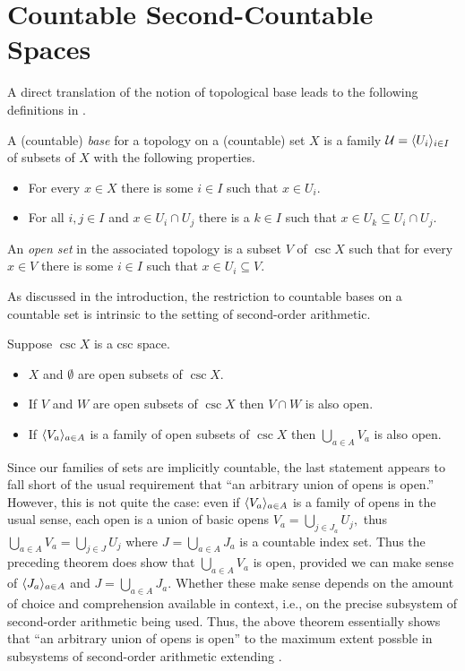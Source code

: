 \documentclass[csc]{subfiles}
\begin{document}
\section{Countable Second-Countable Spaces}

A direct translation of the notion of topological base leads to the following definitions in \ACA.

\begin{definition*}[\ACA]
  A (countable) \emph{base} for a topology on a (countable) set \(X\) is a family \(\mathcal{U} = \langle U_i\rangle_{i \in I}\) of subsets of \(X\) with the following properties.
  \begin{itemize}
  \item For every \(x \in X\) there is some \(i \in I\) such that \(x \in U_i.\)
  \item For all \(i,j \in I\) and \(x \in U_i \cap U_j\) there is a \(k \in I\) such that \(x \in U_k \subseteq U_i \cap U_j.\)
  \end{itemize}

  An \emph{open set} in the associated topology is a subset \(V\) of \(\csc{X}\) such that for every \(x \in V\) there is some \(i \in I\) such that \(x \in U_i \subseteq V.\)
\end{definition*}

\noindent
As discussed in the introduction, the restriction to countable bases on a countable set is intrinsic to the setting of second-order arithmetic.

\begin{theorem*}[\ACA]
  Suppose \(\csc{X}\) is a csc space.
  \begin{itemize}
  \item \(X\) and \(\emptyset\) are open subsets of \(\csc{X}.\)
  \item If \(V\) and \(W\) are open subsets of \(\csc{X}\) then \(V \cap W\) is also open.
  \item If \(\langle V_a\rangle_{a \in A}\) is a family of open subsets of \(\csc{X}\) then \(\bigcup_{a \in A} V_a\) is also open.
  \end{itemize}
\end{theorem*}

\noindent
Since our families of sets are implicitly countable, the last statement appears to fall short of the usual requirement that ``an arbitrary union of opens is open.''
However, this is not quite the case: even if \(\langle V_a\rangle_{a \in A}\) is a family of opens in the usual sense, each open is a union of basic opens \(V_a = \bigcup_{j \in J_a} U_j,\) thus \(\bigcup_{a \in A} V_a = \bigcup_{j \in J} U_j\) where \(J = \bigcup_{a \in A} J_a\) is a countable index set.
Thus the preceding theorem does show that \(\bigcup_{a \in A} V_a\) is open, provided we can make sense of \(\langle J_a\rangle_{a \in A}\) and \(J = \bigcup_{a \in A} J_a.\)
Whether these make sense depends on the amount of choice and comprehension available in context, i.e., on the precise subsystem of second-order arithmetic being used.
Thus, the above theorem essentially shows that ``an arbitrary union of opens is open'' to the maximum extent possble in subsystems of second-order arithmetic extending \ACA.
\end{document}
